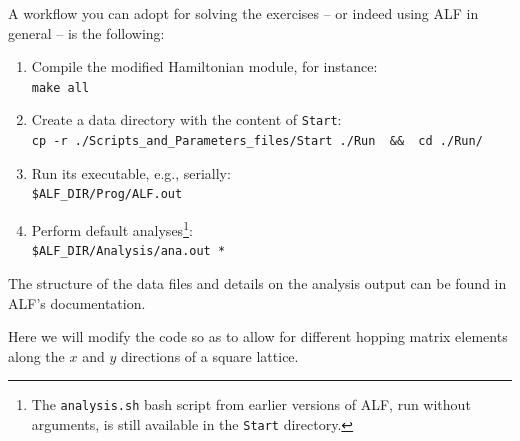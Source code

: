\documentclass[10pt,modern]{scrartcl}
\numberwithin{exerciseitem}{exercise} %
\begin{document}
A workflow you can adopt for solving the exercises -- or indeed using ALF in general -- is the following:
\begin{enumerate}
	\item Compile the modified Hamiltonian module, for instance:\\
	\lstinline[style=bash,morekeywords={make}]{make all}
	\item Create a data directory with the content of \texttt{Start}:\\
	\lstinline[style=bash,morekeywords={cp}]{cp -r ./Scripts_and_Parameters_files/Start ./Run  &&  cd ./Run/}
	\item Run its executable, e.g., serially:\\
	\lstinline[style=bash]{$ALF_DIR/Prog/ALF.out} %
	\item Perform default analyses\footnote{The \texttt{analysis.sh} bash script from earlier versions of ALF, run without arguments, is still available in the \texttt{Start} directory.}:\\
	\lstinline[style=bash]{$ALF_DIR/Analysis/ana.out *} %
\end{enumerate}
The structure of the data files and details on the analysis output can be found in ALF's documentation.




Here we will modify the code  so as to allow  for different hopping matrix elements along the $x$ and $y$ directions of a square lattice.
\end{document}
